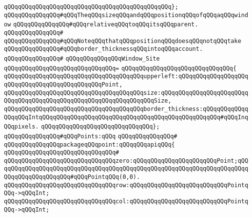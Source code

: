 \verb|qQQqqQQqqQQqqQQqqQQqqQQqqQQqqQQqqQQqqQQqqQQqqQQq};|\newline
\newline
\verb|qQQqqQQqqQQqqQQq#qQQqTheqQQqsizeqQQqandqQQqpositionqQQqofqQQqaqQQqwindow|\newline
\verb|qQQqqQQqqQQqqQQq#qQQqrelativeqQQqtoqQQqitsqQQqparent.|\newline
\verb|qQQqqQQqqQQqqQQq#|\newline
\verb|qQQqqQQqqQQqqQQq#qQQqNoteqQQqthatqQQqpositionqQQqdoesqQQqnotqQQqtake|\newline
\verb|qQQqqQQqqQQqqQQq#qQQqborder_thicknessqQQqintoqQQqaccount.|\newline
\verb|qQQqqQQqqQQqqQQq#|\newline
\verb|qQQqqQQqqQQqqQQqWindow_Site|\newline
\verb|qQQqqQQqqQQqqQQqqQQqqQQqqQQqqQQq=|\newline
\verb|qQQqqQQqqQQqqQQqqQQqqQQqqQQqqQQq{|\newline
\verb|qQQqqQQqqQQqqQQqqQQqqQQqqQQqqQQqqQQqqQQqupperleft:qQQqqQQqqQQqqQQqqQQqqQQqqQQqqQQqqQQqqQQqqQQqqQQqPoint,|\newline
\verb|qQQqqQQqqQQqqQQqqQQqqQQqqQQqqQQqqQQqqQQqsize:qQQqqQQqqQQqqQQqqQQqqQQqqQQqqQQqqQQqqQQqqQQqqQQqqQQqqQQqqQQqqQQqqQQqSize,|\newline
\verb|qQQqqQQqqQQqqQQqqQQqqQQqqQQqqQQqqQQqqQQqborder_thickness:qQQqqQQqqQQqqQQqqQQqIntqQQqqQQqqQQqqQQqqQQqqQQqqQQqqQQqqQQqqQQqqQQqqQQqqQQq#qQQqInqQQqpixels.|\newline
\verb|qQQqqQQqqQQqqQQqqQQqqQQqqQQqqQQq};|\newline
\newline
\newline
\newline
\verb|qQQqqQQqqQQqqQQq#qQQqPoints:qQQq|\newline
\verb|qQQqqQQqqQQqqQQq#|\newline
\verb|qQQqqQQqqQQqqQQqpackageqQQqpoint:qQQqqQQqapiqQQq{|\newline
\verb|qQQqqQQqqQQqqQQqqQQqqQQqqQQqqQQq#|\newline
\verb|qQQqqQQqqQQqqQQqqQQqqQQqqQQqqQQqzero:qQQqqQQqqQQqqQQqqQQqqQQqPoint;qQQqqQQqqQQqqQQqqQQqqQQqqQQqqQQqqQQqqQQqqQQqqQQqqQQqqQQqqQQqqQQqqQQqqQQqqQQqqQQqqQQqqQQqqQQq#qQQqPointqQQq(0,0).|\newline
\newline
\verb|qQQqqQQqqQQqqQQqqQQqqQQqqQQqqQQqrow:qQQqqQQqqQQqqQQqqQQqqQQqqQQqPointqQQq->qQQqInt;|\newline
\verb|qQQqqQQqqQQqqQQqqQQqqQQqqQQqqQQqcol:qQQqqQQqqQQqqQQqqQQqqQQqqQQqPointqQQq->qQQqInt;|\newline

